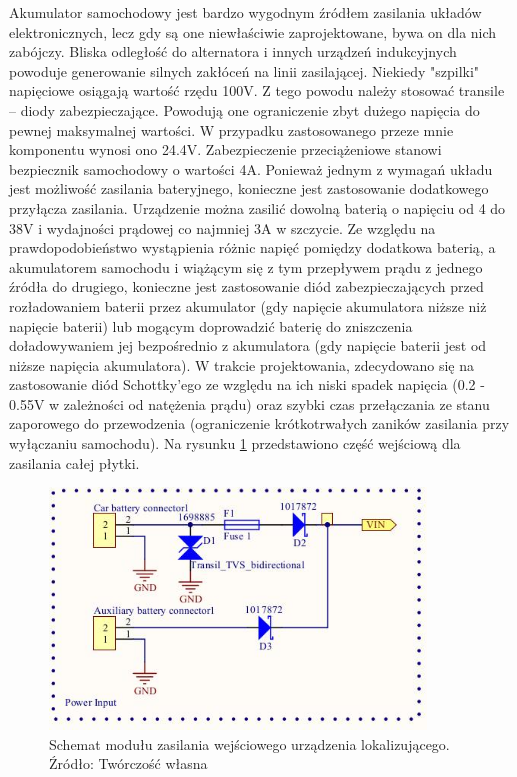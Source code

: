 Akumulator samochodowy jest bardzo wygodnym źródłem zasilania układów elektronicznych, lecz gdy są one niewłaściwie zaprojektowane, bywa on dla nich zabójczy. Bliska odległość do alternatora i innych urządzeń indukcyjnych powoduje generowanie silnych zakłóceń na linii zasilającej. Niekiedy "szpilki" napięciowe osiągają wartość rzędu 100V. Z tego powodu należy stosować transile – diody zabezpieczające. Powodują one ograniczenie zbyt dużego napięcia do pewnej maksymalnej wartości. W przypadku zastosowanego przeze mnie komponentu wynosi ono 24.4V. Zabezpieczenie przeciążeniowe stanowi bezpiecznik samochodowy o wartości 4A. 
Ponieważ jednym z wymagań układu jest możliwość zasilania bateryjnego, konieczne jest zastosowanie dodatkowego przyłącza zasilania. Urządzenie można zasilić dowolną baterią o napięciu od 4 do 38V i wydajności prądowej co najmniej 3A w szczycie. Ze względu na prawdopodobieństwo wystąpienia różnic napięć pomiędzy dodatkowa baterią, a akumulatorem samochodu i wiążącym się z tym przepływem prądu z jednego źródła do drugiego, konieczne jest zastosowanie diód zabezpieczających przed rozładowaniem baterii przez akumulator (gdy napięcie akumulatora niższe niż napięcie baterii) lub mogącym doprowadzić baterię do zniszczenia doładowywaniem jej bezpośrednio z akumulatora (gdy napięcie baterii jest od niższe napięcia akumulatora). W trakcie projektowania, zdecydowano się na zastosowanie diód Schottky’ego ze względu na ich niski spadek napięcia (0.2 - 0.55V w zależności od natężenia prądu) oraz szybki czas przełączania ze stanu zaporowego do przewodzenia (ograniczenie krótkotrwałych zaników zasilania przy wyłączaniu samochodu). Na rysunku \ref{fig:image_mainboard_power_input} przedstawiono część wejściową dla zasilania całej płytki.

\begin{figure}[H]
	\centering
	\includegraphics[width=10cm]{img/schematics/mainboard_power_input.jpg}
	\caption{Schemat modułu zasilania wejściowego urządzenia lokalizującego. \\ Źródło: Twórczość własna}
	\label{fig:image_mainboard_power_input}
\end{figure}

